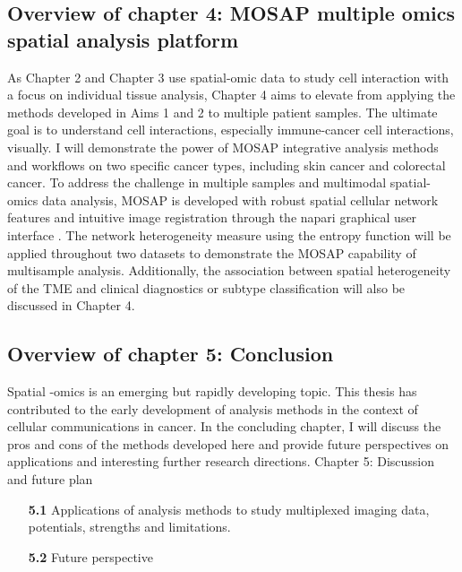 \subsection{Overview of chapter 4: MOSAP multiple omics spatial analysis platform}
As Chapter 2 and Chapter 3 use spatial-omic data to study cell interaction with a focus on individual tissue analysis, Chapter 4 aims to elevate from applying the methods developed in Aims 1 and 2 to multiple patient samples. The ultimate goal is to understand cell interactions, especially immune-cancer cell interactions, visually. I will demonstrate the power of MOSAP integrative analysis methods and workflows on two specific cancer types, including skin cancer and colorectal cancer. To address the challenge in multiple samples and multimodal spatial-omics data analysis, MOSAP is developed with robust spatial cellular network features and intuitive image registration through the napari graphical user interface \cite{chiu2022napari}. The network heterogeneity measure using the entropy function will be applied throughout two datasets to demonstrate the MOSAP capability of multisample analysis. Additionally, the association between spatial heterogeneity of the TME and clinical diagnostics or subtype classification will also be discussed in Chapter 4. 

\subsection{Overview of chapter 5: Conclusion}

Spatial -omics is an emerging but rapidly developing topic. This thesis has contributed to the early development of analysis methods in the context of cellular communications in cancer. In the concluding chapter, I will discuss the pros and cons of the methods developed here and provide future perspectives on applications and interesting further research directions. 
Chapter 5: Discussion and future plan
\begin{enumerate}[align=left]
    \item[\textbf{5.1}] Applications of analysis methods to study multiplexed imaging data, potentials, strengths and limitations. 
    \item[\textbf{5.2}] Future perspective
\end{enumerate}


% 
% 
